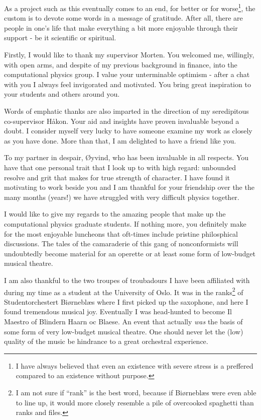 As a project such as this eventually comes to an end, for better or for
worse\footnote{I have always believed that even an existence with severe stress is a preffered
compared to an existence without purpose.},
the custom is to devote some words in a message of gratitude. After all, 
there are people in one's life that make everything a bit more enjoyable through their
support - be it scientific or spiritual.

Firstly, I would like to thank my supervisor Morten. You welcomed me, willingly, with open arms,
and despite of my previous background in finance, into the computational physics group. I value your 
unterminable optimism - after a chat with you I always feel invigorated and motivated. You bring 
great inspiration to your students and others around you.

Words of emphatic thanks are also imparted in the direction of my seredipitous co-supervisor Håkon.
Your aid and insights have proven invaluable beyond a doubt. I consider myself very lucky to have
someone examine my 
work as closely as you have done. More than that, I am delighted to have a friend like you.

To my partner in despair, Øyvind, who has been invaluable in all respects. You have that one personal 
trait that I look up to with high regard: unbounded resolve and grit that makes for true
strength of character. I have found it motivating to work beside you and I am thankful for your 
friendship over the the many months (years!) we have struggled with very difficult physics together.

I would like to give my regards to the amazing people that make up the computational physics graduate
students.
If nothing more, you definitely make for the most enjoyable luncheons that oft-times include
pristine
philosphical discussions. The tales of the camaraderie of this gang of nonconformists will 
undoubtedly become material for an operette or at least some form of low-budget musical theatre.

I am also thankful to the two troupes of troubadours I have been affiliated with during my time as a student 
at the University of Oslo. It was in the ranks\footnote{I am not sure if ``rank'' is the best word, because 
if Biørneblæs were even able to line up, it would more closely resemble a pile of overcooked spaghetti
than ranks and files.} of Studentorchestert Biørneblæs where I first 
picked up the saxophone, and here I found tremendous musical joy. Eventually I was head-hunted to 
become Il Maestro of Blindern Haarn oc Blaese. An event that actually \emph{was}
the basis of some form of very low-budget musical theatre. One should never let the (low) quality
of the music be hindrance to a great orchestral experience.

